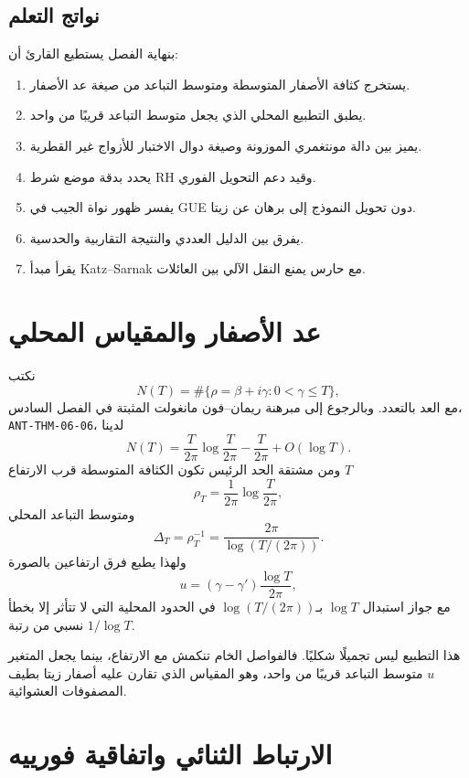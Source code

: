 \subsection*{نواتج التعلم}
بنهاية الفصل يستطيع القارئ أن:
\begin{enumerate}
  \item يستخرج كثافة الأصفار المتوسطة ومتوسط التباعد من صيغة عد الأصفار.
  \item يطبق التطبيع المحلي الذي يجعل متوسط التباعد قريبًا من واحد.
  \item يميز بين دالة مونتغمري الموزونة وصيغة دوال الاختبار للأزواج غير القطرية.
  \item يحدد بدقة موضع شرط RH وقيد دعم التحويل الفوري.
  \item يفسر ظهور نواة الجيب في GUE دون تحويل النموذج إلى برهان عن زيتا.
  \item يفرق بين الدليل العددي والنتيجة التقاربية والحدسية.
  \item يقرأ مبدأ Katz--Sarnak مع حارس يمنع النقل الآلي بين العائلات.
\end{enumerate}

\section{عد الأصفار والمقياس المحلي}

\begin{definition}
\label{def:ch23-zero-count-local-scale}
\provedhere
نكتب
\[
N(T)=\#\{\rho=\beta+i\gamma:0<\gamma\le T\},
\]
مع العد بالتعدد. وبالرجوع إلى مبرهنة ريمان--فون مانغولت المثبتة في الفصل السادس، \texttt{ANT-THM-06-06}، لدينا
\[
N(T)=\frac{T}{2\pi}\log\frac{T}{2\pi}-\frac{T}{2\pi}+O(\log T).
\]
ومن مشتقة الحد الرئيس تكون الكثافة المتوسطة قرب الارتفاع \(T\)
\[
\rho_T=\frac{1}{2\pi}\log\frac{T}{2\pi},
\]
ومتوسط التباعد المحلي
\[
\Delta_T=\rho_T^{-1}=\frac{2\pi}{\log(T/(2\pi))}.
\]
ولهذا يطبع فرق ارتفاعين بالصورة
\[
u=(\gamma-\gamma')\frac{\log T}{2\pi},
\]
مع جواز استبدال \(\log T\) بـ\(\log(T/(2\pi))\) في الحدود المحلية التي لا تتأثر إلا بخطأ نسبي من رتبة \(1/\log T\).
\end{definition}

هذا التطبيع ليس تجميلًا شكليًا. فالفواصل الخام تنكمش مع الارتفاع، بينما يجعل المتغير \(u\) متوسط التباعد قريبًا من واحد، وهو المقياس الذي تقارن عليه أصفار زيتا بطيف المصفوفات العشوائية.

\section{الارتباط الثنائي واتفاقية فورييه}

